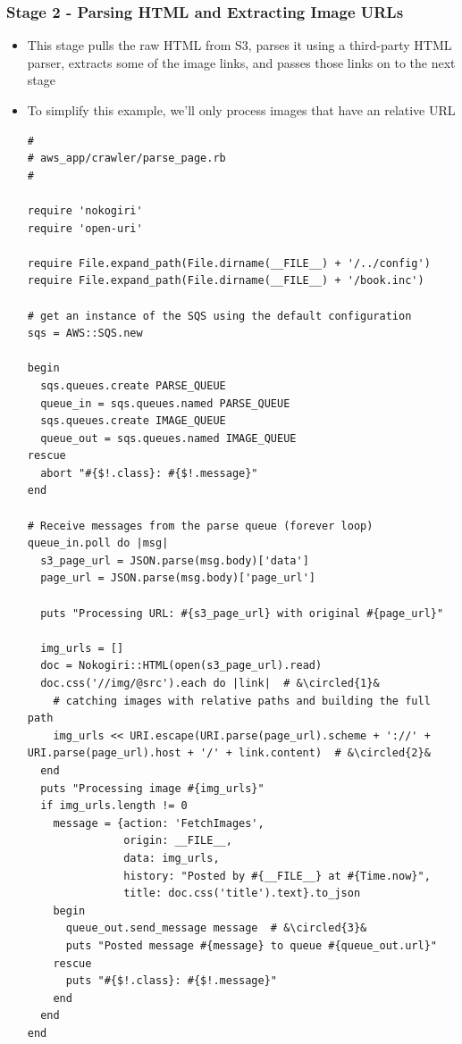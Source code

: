 \documentclass{beamer}
\newcommand*\circled[1]{\tikz[baseline=(char.base)]{
            \node[shape=circle,draw,inner sep=1pt] (char) {#1};}}
\begin{document}
\begin{frame}
\frametitle{Stage 2 - Parsing HTML and Extracting Image URLs}
\begin{itemize}
\item This stage pulls the raw HTML from
S3, parses it using a third-party HTML parser, extracts some of the image links, and
passes those links on to the next stage
\item To simplify this example, we’ll only process images that have an relative URL
\lstset{language=Ruby, style=eclipse}
\begin{lstlisting}[escapechar=&]
#
# aws_app/crawler/parse_page.rb
#

require 'nokogiri'
require 'open-uri'

require File.expand_path(File.dirname(__FILE__) + '/../config')
require File.expand_path(File.dirname(__FILE__) + '/book.inc')

# get an instance of the SQS using the default configuration
sqs = AWS::SQS.new

begin
  sqs.queues.create PARSE_QUEUE
  queue_in = sqs.queues.named PARSE_QUEUE
  sqs.queues.create IMAGE_QUEUE
  queue_out = sqs.queues.named IMAGE_QUEUE
rescue
  abort "#{$!.class}: #{$!.message}"
end

# Receive messages from the parse queue (forever loop)
queue_in.poll do |msg|
  s3_page_url = JSON.parse(msg.body)['data']
  page_url = JSON.parse(msg.body)['page_url']

  puts "Processing URL: #{s3_page_url} with original #{page_url}"

  img_urls = []
  doc = Nokogiri::HTML(open(s3_page_url).read)
  doc.css('//img/@src').each do |link|  # &\circled{1}&
    # catching images with relative paths and building the full path
    img_urls << URI.escape(URI.parse(page_url).scheme + '://' + URI.parse(page_url).host + '/' + link.content)  # &\circled{2}&
  end
  puts "Processing image #{img_urls}"
  if img_urls.length != 0
    message = {action: 'FetchImages',
               origin: __FILE__,
               data: img_urls,
               history: "Posted by #{__FILE__} at #{Time.now}",
               title: doc.css('title').text}.to_json
    begin
      queue_out.send_message message  # &\circled{3}&
      puts "Posted message #{message} to queue #{queue_out.url}"
    rescue
      puts "#{$!.class}: #{$!.message}"
    end
  end
end

\end{lstlisting}


\end{itemize}
\end{frame}
\end{document}
